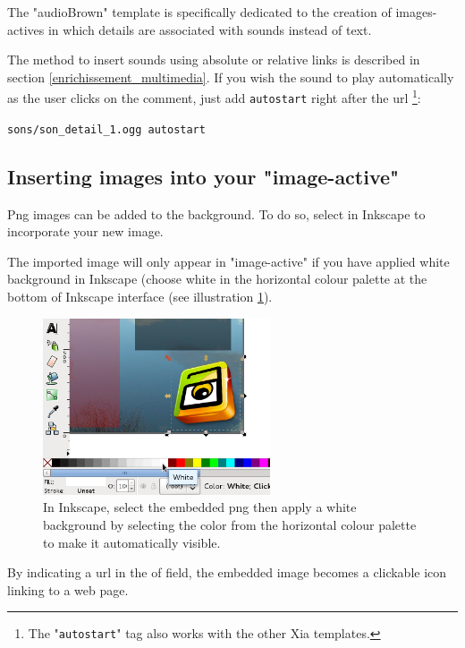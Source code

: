 The "audioBrown" template is specifically dedicated to the creation of 
images-actives in which details are associated with sounds instead of text.

The method to insert sounds using absolute or relative links is described in 
section 
\ref{enrichissement_multimedia}. If you wish the sound to play 
automatically as the user clicks on the comment, just add \verb|autostart| right 
after the url \footnote{The "\texttt{autostart}" tag also works with the other 
Xia templates.}:\\
\begin{center}
 \verb|sons/son_detail_1.ogg autostart|
\end{center}


\subsection{Inserting images into your "image-active"}\label{insertion_images}

Png images can be added to the background. To do so, select  in 
Inkscape to incorporate your new image.

The imported image will only appear in "image-active" if you have applied white background in 
Inkscape (choose white in the horizontal colour palette at the bottom of 
Inkscape interface (see illustration \ref{remplissage_blanc}).

\begin{figure}[htp!]
 \centering\includegraphics[width=0.6\textwidth] {images/remplissage_blanc}
 \caption{In Inkscape, select the embedded png then apply a white background 
 by selecting the color from the horizontal colour palette to make it 
 automatically visible.} 
 \label{remplissage_blanc}
\end{figure}

By indicating a url in the  of  field, 
the embedded image becomes a clickable icon linking to a web page.

